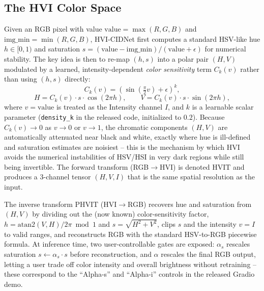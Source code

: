 \documentclass[conference]{IEEEtran}
\begin{document}
\subsection{The HVI Color Space}
Given an RGB pixel with value $\text{value} = \max(R,G,B)$ and
$\text{img\_min} = \min(R,G,B)$, HVI-CIDNet first computes a standard HSV-like
hue $h \in [0,1)$ and saturation $s = (\text{value} - \text{img\_min}) /
(\text{value} + \epsilon)$ for numerical stability. The key idea is then to
re-map $(h,s)$ into a polar pair $(H,V)$ modulated by a learned,
intensity-dependent \emph{color sensitivity} term $C_k(v)$ rather than using
$(h,s)$ directly:
\begin{equation}
C_k(v) = \left(\sin\!\left(\tfrac{\pi}{2} v\right) + \epsilon\right)^{k},
\end{equation}
\begin{equation}
H = C_k(v)\cdot s \cdot \cos(2\pi h), \qquad
V = C_k(v) \cdot s \cdot \sin(2\pi h),
\end{equation}
where $v = \text{value}$ is treated as the Intensity channel $I$, and $k$ is
a learnable scalar parameter (\texttt{density\_k} in the released code,
initialized to $0.2$). Because $C_k(v) \to 0$ as $v \to 0$ or $v \to 1$, the
chromatic components $(H,V)$ are automatically attenuated near black and
white, exactly where hue is ill-defined and saturation estimates are
noisiest -- this is the mechanism by which HVI avoids the numerical
instabilities of HSV/HSI in very dark regions while still being invertible.
The forward transform (RGB$\to$HVI) is denoted $\mathrm{HVIT}$ and produces a
3-channel tensor $(H,V,I)$ that is the same spatial resolution as the input.

The inverse transform $\mathrm{PHVIT}$ (HVI$\to$RGB) recovers hue and
saturation from $(H,V)$ by dividing out the (now known) color-sensitivity
factor, $h = \mathrm{atan2}(V,H)/2\pi \bmod 1$ and
$s=\sqrt{H^2+V^2}$, clips $s$ and the intensity $v=I$ to valid ranges, and
reconstructs RGB with the standard HSV-to-RGB piecewise formula. At inference
time, two user-controllable gates are exposed: $\alpha_s$ rescales saturation
$s \leftarrow \alpha_s \cdot s$ before reconstruction, and $\alpha$ rescales
the final RGB output, letting a user trade off color intensity and overall
brightness without retraining -- these correspond to the ``Alpha-s'' and
``Alpha-i'' controls in the released Gradio demo.
\end{document}
